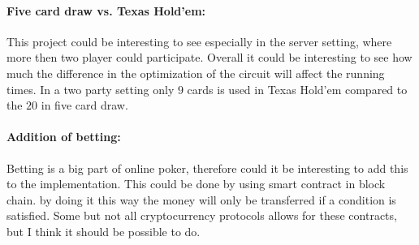 \documentclass[twoside,11pt,openright]{report}
\begin{document}
\paragraph{Five card draw vs. Texas Hold'em:}
This project could be interesting to see especially in the server setting, where more then two player could participate. Overall it could be interesting to see how much the difference in the optimization of the circuit will affect the running times. In a two party setting only $9$ cards is used in Texas Hold'em compared to the $20$ in five card draw.

\paragraph{Addition of betting:}
Betting is a big part of online poker, therefore could it be interesting to add this to the implementation. This could be done by using smart contract in block chain. by doing it this way the money will only be transferred if a condition is satisfied. Some but not all cryptocurrency protocols allows for these contracts, but I think it should be possible to do.


\end{document}
